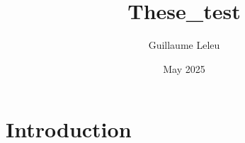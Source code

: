 \documentclass[french,12pt,a4paper]{report}
\title{These_test}
\author{Guillaume Leleu}
\date{May 2025}
\begin{document}
\maketitle

\section{Introduction}
\end{document}
